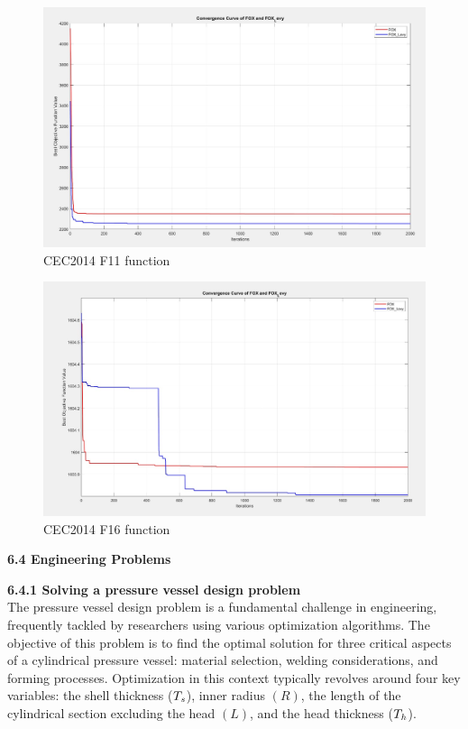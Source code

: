\documentclass[
]{article}
\begin{document}
\begin{justify}
{\begin{figure}[h!]
    \centering
    \includegraphics[width=0.5\linewidth]{WhatsApp Image 2024-04-08 at 1.36.47 AM.jpeg}
    \caption{CEC2014 F11 function}
    \label{fig:enter-label}
\end{figure}

\begin{figure}[h!]
        \centering
        \includegraphics[width=0.5\linewidth]{WhatsApp Image 2024-04-08 at 1.55.29 AM.jpeg}
        \caption{CEC2014 F16 function}
        \label{fig:enter-label}
\end{figure}
    
\newpage
\def\labelenumi{\arabic{enumi}.}
\item
\vspace{5mm}
  \textbf{6.4 Engineering Problems}

\def\labelenumi{\arabic{enumi}.}
\item
\vspace{0.5mm}
  \textbf{6.4.1 Solving a pressure vessel design problem}
\\
The pressure vessel design problem is a fundamental challenge in engineering, frequently tackled by researchers using various optimization algorithms. The objective of this problem is to find the optimal solution for three critical aspects of a cylindrical pressure vessel: material selection, welding considerations, and forming processes. Optimization in this context typically revolves around four key variables: the shell thickness (\(T_{\text{\textit{s}}}\)), inner radius \((R)\), the length of the cylindrical section excluding the head \((L)\), and the head thickness (\(T_{\text{\textit{h}}}\)).

}
\end{justify}
\end{document}
